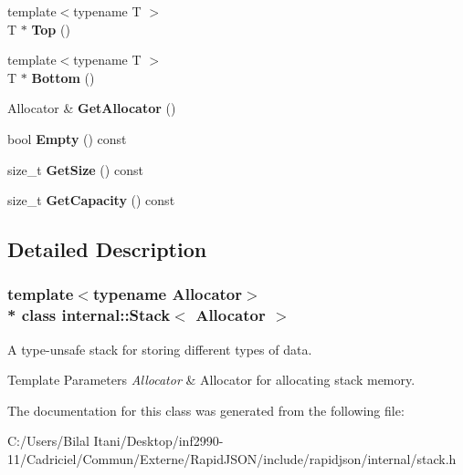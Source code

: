 \begin{DoxyCompactItemize}
\item 
{\footnotesize template$<$typename T $>$ }\\T $\ast$ {\bfseries Top} ()\hypertarget{classinternal_1_1_stack_ab3ed5b4afed3c73c516678516d5e195b}{}\label{classinternal_1_1_stack_ab3ed5b4afed3c73c516678516d5e195b}

\item 
{\footnotesize template$<$typename T $>$ }\\T $\ast$ {\bfseries Bottom} ()\hypertarget{classinternal_1_1_stack_a10aa1bc716b82cb0a40b3a3b9d5efe87}{}\label{classinternal_1_1_stack_a10aa1bc716b82cb0a40b3a3b9d5efe87}

\item 
Allocator \& {\bfseries Get\+Allocator} ()\hypertarget{classinternal_1_1_stack_ab01f693833dfe136f574d66547623cfa}{}\label{classinternal_1_1_stack_ab01f693833dfe136f574d66547623cfa}

\item 
bool {\bfseries Empty} () const \hypertarget{classinternal_1_1_stack_abf57d1c7b356d8acbbe0e79147ca4b5c}{}\label{classinternal_1_1_stack_abf57d1c7b356d8acbbe0e79147ca4b5c}

\item 
size\+\_\+t {\bfseries Get\+Size} () const \hypertarget{classinternal_1_1_stack_ade4a25fa82950619652a30aa3a807f58}{}\label{classinternal_1_1_stack_ade4a25fa82950619652a30aa3a807f58}

\item 
size\+\_\+t {\bfseries Get\+Capacity} () const \hypertarget{classinternal_1_1_stack_a61dea1ed780c07bb438d17c581ab0e48}{}\label{classinternal_1_1_stack_a61dea1ed780c07bb438d17c581ab0e48}

\end{DoxyCompactItemize}


\subsection{Detailed Description}
\subsubsection*{template$<$typename Allocator$>$\\*
class internal\+::\+Stack$<$ Allocator $>$}

A type-\/unsafe stack for storing different types of data. 


\begin{DoxyTemplParams}{Template Parameters}
{\em Allocator} & Allocator for allocating stack memory. \\
\hline
\end{DoxyTemplParams}


The documentation for this class was generated from the following file\+:\begin{DoxyCompactItemize}
\item 
C\+:/\+Users/\+Bilal Itani/\+Desktop/inf2990-\/11/\+Cadriciel/\+Commun/\+Externe/\+Rapid\+J\+S\+O\+N/include/rapidjson/internal/stack.\+h\end{DoxyCompactItemize}
